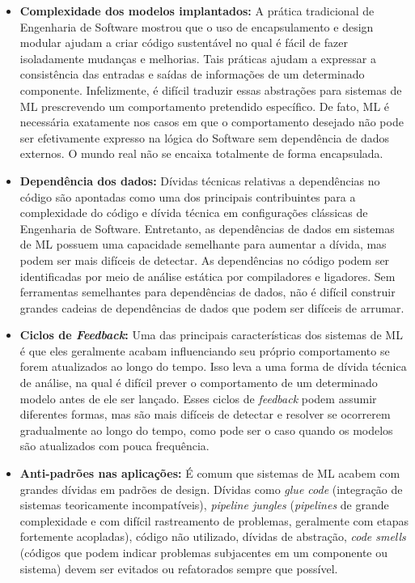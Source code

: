 \documentclass[Portugues,Final]{ic-tese-v3}
\begin{document}
\begin{itemize}
    \item \textbf{Complexidade dos modelos implantados:} A prática tradicional de Engenharia de Software mostrou que o uso de encapsulamento e design modular ajudam a criar código sustentável no qual é fácil de fazer isoladamente mudanças e melhorias. Tais práticas ajudam a expressar a consistência das entradas e saídas de informações de um determinado componente. Infelizmente, é difícil traduzir essas abstrações para sistemas de ML prescrevendo um comportamento pretendido específico. De fato, ML é necessária exatamente nos casos em que o comportamento desejado não pode ser efetivamente expresso na lógica do Software sem dependência de dados externos. O mundo real não se encaixa totalmente de forma encapsulada.
    \item \textbf{Dependência dos dados:} Dívidas técnicas relativas a dependências no código são apontadas como uma dos principais contribuintes para a complexidade do código e dívida técnica em configurações clássicas de Engenharia de Software. Entretanto, as dependências de dados em sistemas de ML possuem uma capacidade semelhante para aumentar a dívida, mas podem ser mais difíceis de detectar. As dependências no código podem ser identificadas por meio de análise estática por compiladores e ligadores. Sem ferramentas semelhantes para dependências de dados, não é difícil construir grandes cadeias de dependências de dados que podem ser difíceis de arrumar.
    \item \textbf{Ciclos de \textit{Feedback}:} Uma das principais características dos sistemas de ML é que eles geralmente acabam influenciando seu próprio comportamento se forem atualizados ao longo do tempo. Isso leva a uma forma de dívida técnica de análise, na qual é difícil prever o comportamento de um determinado modelo antes de ele ser lançado. Esses ciclos de \textit{feedback} podem assumir diferentes formas, mas são mais difíceis de detectar e resolver se ocorrerem gradualmente ao longo do tempo, como pode ser o caso quando os modelos são atualizados com pouca frequência.
    \item \textbf{Anti-padrões nas aplicações:} É comum que sistemas de ML acabem com grandes dívidas em padrões de design. Dívidas como \textit{glue code} (integração de sistemas teoricamente incompatíveis), \textit{pipeline jungles} (\textit{pipelines} de grande complexidade e com difícil rastreamento de problemas, geralmente com etapas fortemente acopladas), código não utilizado, dívidas de abstração, \textit{code smells} (códigos que podem indicar problemas subjacentes em um componente ou sistema) devem ser evitados ou refatorados sempre que possível.

\end{itemize}
\end{document}
